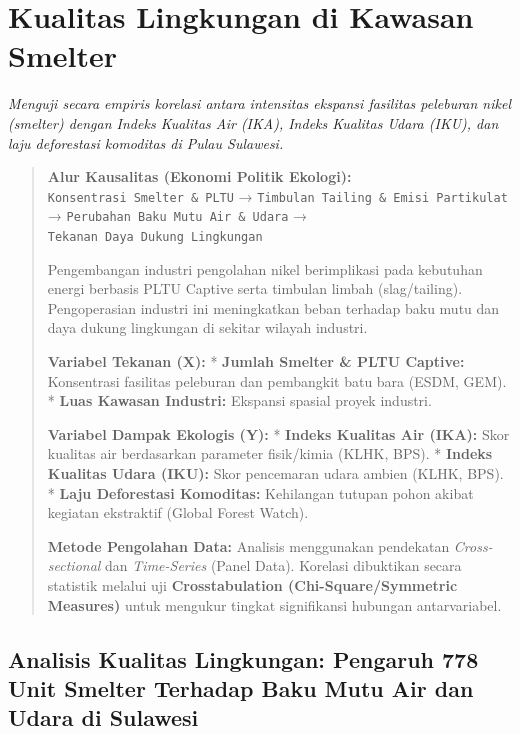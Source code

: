 \documentclass[
]{article}
\author{}
\date{}
\begin{document}
\section{Kualitas Lingkungan di Kawasan
Smelter}\label{kualitas-lingkungan-di-kawasan-smelter}

\emph{Menguji secara empiris korelasi antara intensitas ekspansi
fasilitas peleburan nikel (smelter) dengan Indeks Kualitas Air (IKA),
Indeks Kualitas Udara (IKU), dan laju deforestasi komoditas di Pulau
Sulawesi.}

\begin{quote}
\textbf{Alur Kausalitas (Ekonomi Politik Ekologi):}
\texttt{Konsentrasi\ Smelter\ \&\ PLTU} →
\texttt{Timbulan\ Tailing\ \&\ Emisi\ Partikulat} →
\texttt{Perubahan\ Baku\ Mutu\ Air\ \&\ Udara} →
\texttt{Tekanan\ Daya\ Dukung\ Lingkungan}

Pengembangan industri pengolahan nikel berimplikasi pada kebutuhan
energi berbasis PLTU Captive serta timbulan limbah (slag/tailing).
Pengoperasian industri ini meningkatkan beban terhadap baku mutu dan
daya dukung lingkungan di sekitar wilayah industri.

\textbf{Variabel Tekanan (X):} * \textbf{Jumlah Smelter \& PLTU
Captive:} Konsentrasi fasilitas peleburan dan pembangkit batu bara
(ESDM, GEM). * \textbf{Luas Kawasan Industri:} Ekspansi spasial proyek
industri.

\textbf{Variabel Dampak Ekologis (Y):} * \textbf{Indeks Kualitas Air
(IKA):} Skor kualitas air berdasarkan parameter fisik/kimia (KLHK, BPS).
* \textbf{Indeks Kualitas Udara (IKU):} Skor pencemaran udara ambien
(KLHK, BPS). * \textbf{Laju Deforestasi Komoditas:} Kehilangan tutupan
pohon akibat kegiatan ekstraktif (Global Forest Watch).

\textbf{Metode Pengolahan Data:} Analisis menggunakan pendekatan
\emph{Cross-sectional} dan \emph{Time-Series} (Panel Data). Korelasi
dibuktikan secara statistik melalui uji \textbf{Crosstabulation
(Chi-Square/Symmetric Measures)} untuk mengukur tingkat signifikansi
hubungan antarvariabel.
\end{quote}

\subsection{Analisis Kualitas Lingkungan: Pengaruh 778 Unit Smelter
Terhadap Baku Mutu Air dan Udara di
Sulawesi}\label{analisis-kualitas-lingkungan-pengaruh-778-unit-smelter-terhadap-baku-mutu-air-dan-udara-di-sulawesi}
\end{document}
